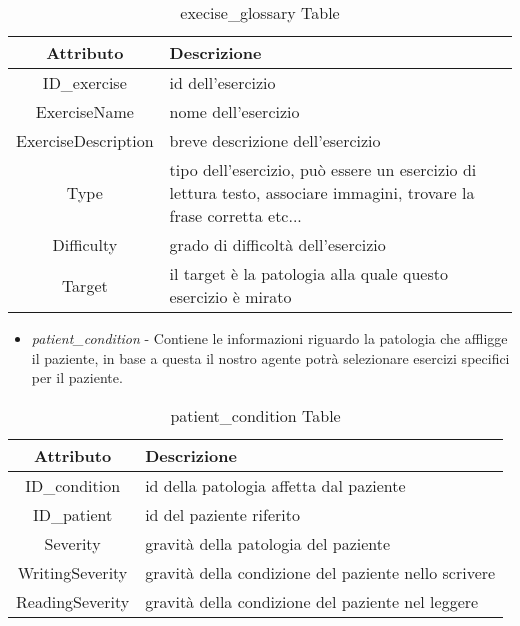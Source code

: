 \documentclass{article}
\begin{document}
    \begin{table}[h]
        \centering
        \caption{execise\_glossary Table}
        \begin{tabular}{|c|p{8cm}|}
            \hline
            \textbf{Attributo} & \textbf{Descrizione} \\
            \hline
                ID\_exercise & id dell'esercizio\\
            \hline
                ExerciseName & nome dell'esercizio\\
            \hline
                ExerciseDescription & breve descrizione dell'esercizio\\
            \hline
                Type & tipo dell'esercizio, può essere un esercizio di lettura testo, associare immagini, trovare la frase corretta etc...\\
            \hline
                Difficulty & grado di difficoltà dell'esercizio\\
            \hline
                Target & il target è la patologia alla quale questo esercizio è mirato\\
            \hline
        \end{tabular}
    \end{table}

\begin{itemize}
\item     \textit{patient\_condition} - Contiene le informazioni riguardo la patologia che affligge il paziente, in base a questa il nostro agente potrà selezionare esercizi specifici per il paziente.
\end{itemize}

    \begin{table}[h]
        \centering
        \caption{patient\_condition Table}
        \begin{tabular}{|c|p{8cm}|}
            \hline
            \textbf{Attributo} & \textbf{Descrizione} \\
            \hline
                ID\_condition & id della patologia affetta dal paziente\\
            \hline
                ID\_patient & id del paziente riferito\\
            \hline
                Severity & gravità della patologia del paziente \\
            \hline
                WritingSeverity & gravità della condizione del paziente nello scrivere\\
            \hline
                ReadingSeverity & gravità della condizione del paziente nel leggere\\
            \hline
        \end{tabular}
    \end{table}
\end{document}
